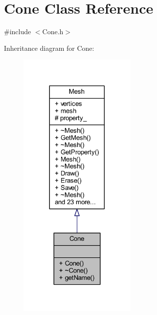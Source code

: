 \hypertarget{class_cone}{}\section{Cone Class Reference}
\label{class_cone}


{\ttfamily \#include $<$Cone.\+h$>$}



Inheritance diagram for Cone\+:
\nopagebreak
\begin{figure}[H]
\begin{center}
\leavevmode
\includegraphics[width=164pt]{class_cone__inherit__graph}
\end{center}
\end{figure}


